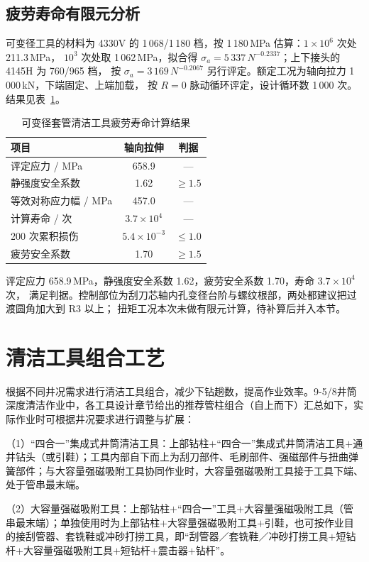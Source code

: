 \subsection{疲劳寿命有限元分析}
可变径工具的材料为 4330V 的 1\,068/1\,180 档，按 1\,180\,MPa 估算：$1\times10^{6}$ 次处 211.3\,MPa，
$10^{3}$ 次处取 1\,062\,MPa，拟合得 $\sigma_a=5\,337\,N^{-0.2337}$；上下接头的 4145H 为 760/965 档，
按 $\sigma_a=3\,169\,N^{-0.2067}$ 另行评定。额定工况为轴向拉力 1\,000\,kN，下端固定、上端加载，
按 $R=0$ 脉动循环评定，设计循环数 1\,000 次。结果见表~\ref{tab:fatigue_var}。

\begin{table}[htbp]
\centering
\caption{可变径套管清洁工具疲劳寿命计算结果}
\label{tab:fatigue_var}
\begin{tabular}{lcc}
\hline
项目 & 轴向拉伸 & 判据 \\
\hline
评定应力 / MPa & 658.9 & --- \\
静强度安全系数 & 1.62 & $\ge 1.5$ \\
等效对称应力幅 / MPa & 457.0 & --- \\
计算寿命 / 次 & $3.7\times10^{4}$ & --- \\
200 次累积损伤 & $5.4\times10^{-3}$ & $\le 1.0$ \\
疲劳安全系数 & 1.70 & $\ge 1.5$ \\
\hline
\end{tabular}
\end{table}

评定应力 658.9\,MPa，静强度安全系数 1.62，疲劳安全系数 1.70，寿命 $3.7\times10^{4}$ 次，
满足判据。控制部位为刮刀芯轴内孔变径台阶与螺纹根部，两处都建议把过渡圆角加大到 R3 以上；
扭矩工况本次未做有限元计算，待补算后并入本节。

\section{清洁工具组合工艺}

根据不同井况需求进行清洁工具组合，减少下钻趟数，提高作业效率。9-5/8\inch 井筒深度清洁作业中，各工具设计章节给出的推荐管柱组合（自上而下）汇总如下，实际作业时可根据井况要求进行调整与扩展：

（1）“四合一”集成式井筒清洁工具：上部钻柱$+$“四合一”集成式井筒清洁工具$+$通井钻头（或引鞋）；工具内部自下而上为刮刀部件、毛刷部件、强磁部件与扭曲弹簧部件；与大容量强磁吸附工具协同作业时，大容量强磁吸附工具接于工具下端、处于管串最末端。

（2）大容量强磁吸附工具：上部钻柱$+$“四合一”工具$+$大容量强磁吸附工具（管串最末端）；单独使用时为上部钻柱$+$大容量强磁吸附工具$+$引鞋，也可按作业目的接刮管器、套铣鞋或冲砂打捞工具，即“刮管器／套铣鞋／冲砂打捞工具$+$短钻杆$+$大容量强磁吸附工具$+$短钻杆$+$震击器$+$钻杆”。

